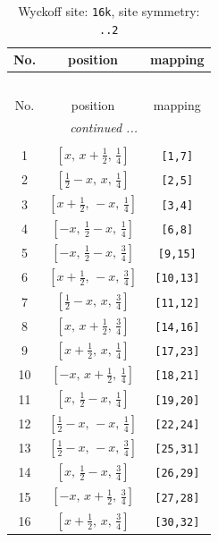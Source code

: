 \documentclass[fleqn,8pt]{jsarticle}
\begin{document}
\renewcommand{\arraystretch}{1.2}
\begin{longtable}{ccc}
\caption{Wyckoff site: {\tt 16k}, site symmetry: {\tt ..2}}
 \\
 \hline \hline
No. & position & mapping \\ \hline \endfirsthead

\multicolumn{2}{l}{\tablename\ \thetable{}} \\
 \hline \hline
No. & position & mapping \\ \hline \endhead

 \hline \hline
\multicolumn{2}{r}{\footnotesize\it continued ...} \\ \endfoot

 \hline \hline
\multicolumn{2}{r}{} \\ \endlastfoot

1 & $\left[ x,\, x + \frac{1}{2},\, \frac{1}{4} \right]$ & {\tt [1,7]} \\ \hline
2 & $\left[ \frac{1}{2} - x,\, x,\, \frac{1}{4} \right]$ & {\tt [2,5]} \\ \hline
3 & $\left[ x + \frac{1}{2},\, - x,\, \frac{1}{4} \right]$ & {\tt [3,4]} \\ \hline
4 & $\left[ - x,\, \frac{1}{2} - x,\, \frac{1}{4} \right]$ & {\tt [6,8]} \\ \hline
5 & $\left[ - x,\, \frac{1}{2} - x,\, \frac{3}{4} \right]$ & {\tt [9,15]} \\ \hline
6 & $\left[ x + \frac{1}{2},\, - x,\, \frac{3}{4} \right]$ & {\tt [10,13]} \\ \hline
7 & $\left[ \frac{1}{2} - x,\, x,\, \frac{3}{4} \right]$ & {\tt [11,12]} \\ \hline
8 & $\left[ x,\, x + \frac{1}{2},\, \frac{3}{4} \right]$ & {\tt [14,16]} \\ \hline
9 & $\left[ x + \frac{1}{2},\, x,\, \frac{1}{4} \right]$ & {\tt [17,23]} \\ \hline
10 & $\left[ - x,\, x + \frac{1}{2},\, \frac{1}{4} \right]$ & {\tt [18,21]} \\ \hline
11 & $\left[ x,\, \frac{1}{2} - x,\, \frac{1}{4} \right]$ & {\tt [19,20]} \\ \hline
12 & $\left[ \frac{1}{2} - x,\, - x,\, \frac{1}{4} \right]$ & {\tt [22,24]} \\ \hline
13 & $\left[ \frac{1}{2} - x,\, - x,\, \frac{3}{4} \right]$ & {\tt [25,31]} \\ \hline
14 & $\left[ x,\, \frac{1}{2} - x,\, \frac{3}{4} \right]$ & {\tt [26,29]} \\ \hline
15 & $\left[ - x,\, x + \frac{1}{2},\, \frac{3}{4} \right]$ & {\tt [27,28]} \\ \hline
16 & $\left[ x + \frac{1}{2},\, x,\, \frac{3}{4} \right]$ & {\tt [30,32]} \\
\end{longtable}
\end{document}
